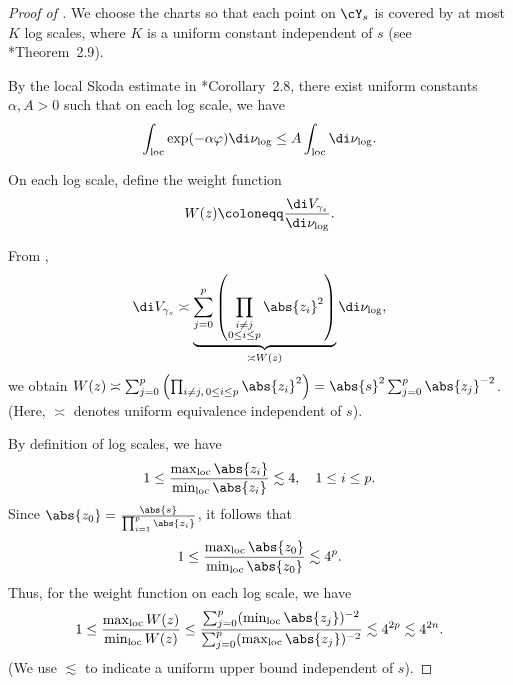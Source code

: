 \documentclass[12pt]{amsart}
\begin{document}
\begin{proof}[Proof of ]
    We choose the charts so that each point on $\cY_s$ is covered by at most $K$ log scales, where $K$ is a uniform constant independent of $s$ (see \cite{Li2024}*{Theorem~2.9}).
    
    By the local Skoda estimate in \cite{Li2024}*{Corollary~2.8}, there exist uniform constants $\alpha, A > 0$ such that on each log scale, we have
    \begin{equation}
        \label{eqn:log-skoda}
        \int_{\rm loc} \exp(-\alpha \varphi) \di \nu_{\log} \leq A \int_{\rm loc} \di \nu_{\log}.
    \end{equation}

    On each log scale, define the weight function $$W(z) \coloneqq \frac{\di V_{\gamma_s}}{\di \nu_{\log}}. $$

    From ,
    \[
    \di V_{\gamma_s} \asymp \underbrace{\sum_{j=0}^p \left(\prod_{\substack{i \neq j \\ 0 \leq i \leq p}} \abs{z_i}^2 \right)}_{\asymp W(z)} \di \nu_{\log},
    \]
    we obtain $W(z) \asymp \sum_{j=0}^p \left(\prod_{i \neq j, \, 0 \leq i \leq p} \abs{z_i}^2 \right) = \abs{s}^2 
    \sum_{j=0}^p\abs{z_j}^{-2} $. (Here, $\asymp$ denotes uniform equivalence independent of $s$).
    
    By definition of log scales, we have 
    \[
    1 \leq \frac{\max_{\rm loc} \abs{z_i}}{\min_{\rm loc}\abs{z_i}} \lesssim 4, \quad 1 \leq i \leq p.
    \]
    Since $\abs{z_0} = \frac{\abs{s}}{\prod_{i = 1}^p\abs{z_i}}$, it follows that 
    \[
    1 \leq \frac{\max_{\rm loc} \abs{z_0}}{\min_{\rm loc}\abs{z_0}} \lesssim 4^p.
    \]
    Thus, for the weight function on each log scale, we have 
    \begin{equation}
        \label{eqn:volume-over-log-weight-bound}
        1 \leq \frac{\max_{\rm loc} W(z)}{\min_{\rm loc} W(z)}
        \leq \frac{\sum_{j=0}^p (\min_{\rm loc} \abs{z_j})^{-2}}{\sum_{j=0}^p (\max_{\rm loc} \abs{z_j})^{-2}}
        \lesssim 4^{2p} \lesssim 4^{2n}.
    \end{equation}
    (We use $\lesssim$ to indicate a uniform upper bound independent of $s$).


\end{proof}
\end{document}
